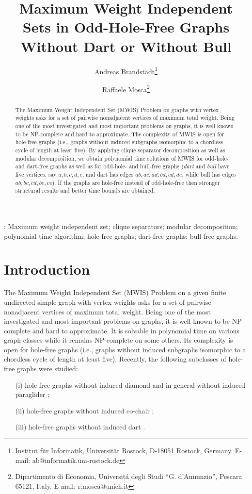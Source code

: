 \documentclass[11pt]{article}
\title{Maximum Weight Independent Sets in Odd-Hole-Free Graphs Without Dart or Without Bull}
\author{
Andreas Brandst\"adt\thanks{Institut f\"ur Informatik, Universit\"at Rostock, 
D-18051 Rostock, Germany. E-mail: ab@informatik.uni-rostock.de} 
\and
Raffaele Mosca\thanks{Dipartimento di Economia, Universit\'a degli Studi ``G. d'Annunzio'', Pescara 65121, Italy. 
E-mail: r.mosca@unich.it}}
\date{}
\newcommand{\0}{\text{ has a co-join to }}
\newcommand{\1}{\text{ has a join to }}
\begin{document}
\maketitle

\begin{abstract} 
The Maximum Weight Independent Set (MWIS) Problem on graphs with vertex weights asks for a set of pairwise nonadjacent vertices of maximum total weight. Being one of the most investigated and most important problems on graphs, it is well known to be NP-complete and hard to approximate. 
The complexity of MWIS is open for hole-free graphs (i.e., graphs without induced subgraphs isomorphic to a chordless cycle of length at least five). By applying clique separator decomposition as well as modular decomposition, we obtain polynomial time solutions of MWIS for odd-hole- and dart-free graphs as well as for odd-hole- and bull-free graphs ({\em dart} and {\em bull} have five vertices, say $a,b,c,d,e$, and dart has edges $ab,ac,ad,bd,cd,de$, while bull has edges 
$ab,bc,cd,be,ce$). If the graphs are hole-free instead of odd-hole-free then stronger structural results and better time bounds are obtained.
\end{abstract}

: Maximum weight independent set; clique separators; modular decomposition; polynomial time algorithm; 
hole-free graphs; dart-free graphs; bull-free graphs.

\section{Introduction}

The Maximum Weight Independent Set (MWIS) Problem on a given finite undirected simple graph with vertex weights asks for a set of pairwise nonadjacent vertices of maximum total weight. Being one of the most investigated and most important problems on graphs, it is well known to be NP-complete and hard to approximate. It is solvable in polynomial time on various graph classes while it remains NP-complete on some others. Its complexity is open for hole-free graphs (i.e., graphs without induced subgraphs isomorphic to a chordless cycle of length at least five). Recently, the following subclasses of hole-free graphs were studied: 
\begin{itemize} 
\item[(i)] hole-free graphs without induced diamond and in general without induced paraglider \cite{BraGiaMaf2012}; 
\item[(ii)] hole-free graphs without induced co-chair \cite{BraGia2012};
\item[(iii)] hole-free graphs without induced dart \cite{BasChaKar2012}.  
\end{itemize} 
\end{document}
